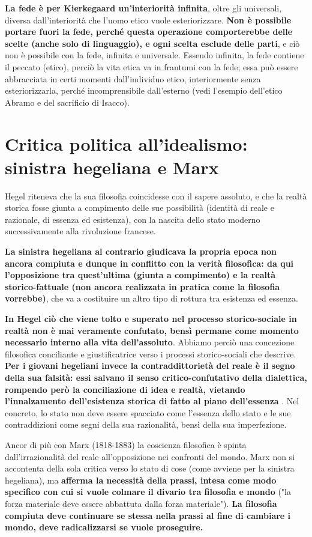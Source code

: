 \textbf{La fede è per Kierkegaard un'interiorità infinita}, oltre gli universali, diversa dall'interiorità che l'uomo etico vuole esteriorizzare. \textbf{Non è possibile portare fuori la fede, perché questa operazione comporterebbe delle scelte (anche solo di linguaggio), e ogni scelta esclude delle parti}, e ciò non è possibile con la fede, infinita e universale. Essendo infinita, la fede contiene il peccato (etico), perciò la vita etica va in frantumi con la fede; essa può essere abbracciata in certi momenti dall'individuo etico, interiormente senza esteriorizzarla, perché incomprensibile dall'esterno (vedi l'esempio dell'etico Abramo e del sacrificio di Isacco).
 
 \section{Critica politica all'idealismo: sinistra hegeliana e Marx}
 
 Hegel riteneva che la sua filosofia coincidesse con il sapere assoluto, e che la realtà storica fosse giunta a compimento delle sue possibilità (identità di reale e razionale, di essenza ed esistenza), con la nascita dello stato moderno successivamente alla rivoluzione francese.
 
 \textbf{La sinistra hegeliana al contrario giudicava la propria epoca non ancora compiuta e dunque in conflitto con la verità filosofica: da qui l'opposizione tra quest'ultima (giunta a compimento) e la realtà storico-fattuale (non ancora realizzata in pratica come la filosofia vorrebbe)}, che va a costituire un altro tipo di rottura tra esistenza ed essenza.
 
 \textbf{In Hegel ciò che viene tolto e superato nel processo storico-sociale in realtà non è mai veramente confutato, bensì permane come momento necessario interno alla vita dell'assoluto}. Abbiamo perciò una concezione filosofica conciliante e giustificatrice verso i processi storico-sociali che descrive. \textbf{Per i giovani hegeliani invece la contraddittorietà del reale è il segno della sua falsità: essi salvano il senso critico-confutativo della dialettica, rompendo però la conciliazione di idea e realtà, vietando l'innalzamento dell'esistenza storica di fatto al piano dell'essenza }. Nel concreto, lo stato non deve essere spacciato come l'essenza dello stato e le sue contraddizioni come segni della sua razionalità, bensì della sua imperfezione.
 
 Ancor di più con Marx (1818-1883) la coscienza filosofica è spinta dall'irrazionalità del reale all'opposizione nei confronti del mondo. Marx non si accontenta della sola critica verso lo stato di cose (come avviene per la sinistra hegeliana), ma \textbf{afferma la necessità della prassi, intesa come modo specifico con cui si vuole colmare il divario tra filosofia e mondo} ("la forza materiale deve essere abbattuta dalla forza materiale"). \textbf{La filosofia compiuta deve continuare se stessa nella prassi al fine di cambiare i mondo, deve radicalizzarsi se vuole proseguire.}
 
